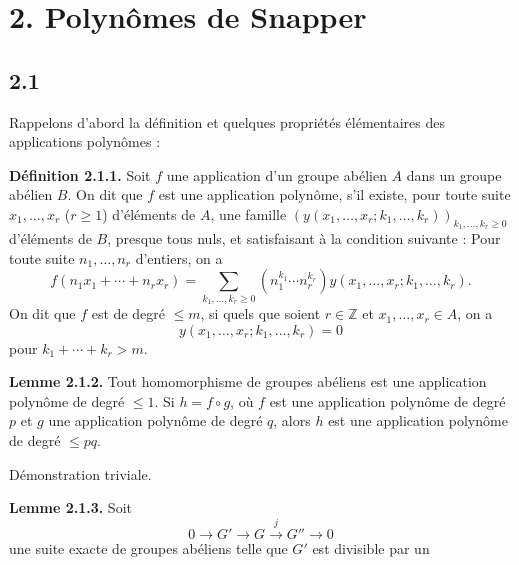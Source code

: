 \section*{2. Polynômes de Snapper}

\subsection*{2.1}
Rappelons d'abord la définition et quelques propriétés élémentaires des applications polynômes :

\textbf{Définition 2.1.1.} Soit $f$ une application d'un groupe abélien $A$ dans un groupe abélien $B$. On dit que $f$ est une application polynôme, s'il existe, pour toute suite $x_1,\ldots,x_r$ ($r\geq1$) d'éléments de $A$, une famille $(y(x_1,\ldots,x_r;k_1,\ldots,k_r))_{k_1,\ldots,k_r\geq0}$ d'éléments de $B$, presque tous nuls, et satisfaisant à la condition suivante : Pour toute suite $n_1,\ldots,n_r$ d'entiers, on a
\[
f(n_1x_1+\cdots+n_rx_r)=
\sum_{k_1,\ldots,k_r\geq0}(n_1^{k_1}\cdots n_r^{k_r})
y(x_1,\ldots,x_r;k_1,\ldots,k_r).
\]
On dit que $f$ est de degré $\leq m$, si quels que soient $r\in\mathbb Z$ et $x_1,\ldots,x_r\in A$, on a
\[
y(x_1,\ldots,x_r;k_1,\ldots,k_r)=0
\]
pour $k_1+\cdots+k_r>m$.

\textbf{Lemme 2.1.2.} Tout homomorphisme de groupes abéliens est une application polynôme de degré $\leq1$. Si $h=f\circ g$, où $f$ est une application polynôme de degré $p$ et $g$ une application polynôme de degré $q$, alors $h$ est une application polynôme de degré $\leq pq$.

Démonstration triviale.

\textbf{Lemme 2.1.3.} Soit
\[
0\longrightarrow G'\longrightarrow G\xrightarrow{j}G''\longrightarrow0
\]
une suite exacte de groupes abéliens telle que $G'$ est divisible par un
